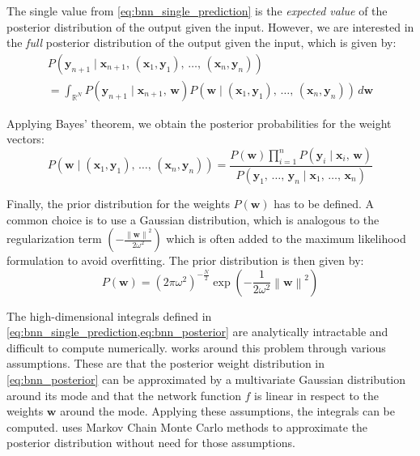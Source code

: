 The single value from \cref{eq:bnn_single_prediction} is the \emph{expected value} of the posterior distribution of the output given the input.
However, we are interested in the \emph{full} posterior distribution of the output given the input, which is given by:
\begin{multline}\label{eq:bnn_posterior}
    P(\textbf{y}_{n+1} \mid \textbf{x}_{n+1},\,\left(\textbf{x}_1,  \textbf{y}_1 \right),\,\dots,\,\left(\textbf{x}_n,  \textbf{y}_n \right)) \\
        = \int_{\mathds{R}^N}
            P(\textbf{y}_{n+1} \mid \textbf{x}_{n+1},\,\textbf{w})
            P(\textbf{w} \mid \left(\textbf{x}_1,  \textbf{y}_1 \right),\,\dots,\,\left(\textbf{x}_n,  \textbf{y}_n \right))
            \,d\textbf{w}
\end{multline}

Applying Bayes' theorem, we obtain the posterior probabilities for the weight vectors:
\begin{equation}
    P(\textbf{w} \mid \left(\textbf{x}_1,  \textbf{y}_1 \right),\,\dots,\,\left(\textbf{x}_n,  \textbf{y}_n \right))
    = \frac{
        P(\textbf{w}) \prod_{i=1}^{n} P(\textbf{y}_i \mid \textbf{x}_i,\,\textbf{w})
    }{
        P(\textbf{y}_1,\,\dots,\,\textbf{y}_n \mid \textbf{x}_1,\,\dots,\,\textbf{x}_n)
    }
\end{equation}

Finally, the prior distribution for the weights $P(\textbf{w})$ has to be defined. A common choice is to use a Gaussian distribution,
which is analogous to the regularization term $\left(-\frac{\left\lVert \textbf{w} \right\rVert^2}{2\omega^2}\right)$ which is often added to the
maximum likelihood formulation to avoid overfitting. The prior distribution is then given by:
\begin{equation}
    P(\textbf{w}) = (2\pi\omega^2)^{-\frac{N}{2}} \exp \left( -\frac{1}{2\omega^2} \left\lVert \textbf{w} \right\rVert^2 \right)
\end{equation}


The high-dimensional integrals defined in \cref{eq:bnn_single_prediction,eq:bnn_posterior} are analytically intractable and
difficult to compute numerically. \Textcite{mackayBayesianMethodsAdaptive1999} works around this problem through various assumptions.
These are that the posterior weight distribution in \cref{eq:bnn_posterior} can be approximated by a multivariate Gaussian distribution around its mode
and that the network function $f$ is linear in respect to the weights $\textbf{w}$ around the mode. Applying these assumptions, the integrals
can be computed. \Textcite{nealBayesianTrainingBackpropagation1992} uses Markov Chain Monte Carlo methods to approximate the posterior distribution without
need for those assumptions.

